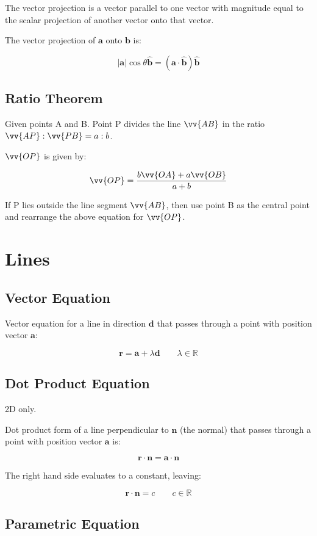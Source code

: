 \documentclass[a4paper,11pt]{report}
\newcommand{\bb}{\boldsymbol}
\begin{document}
The vector projection is a vector parallel to one vector with magnitude equal to
the scalar projection of another vector onto that vector.

The vector projection of $\bb{a}$ onto $\bb{b}$ is:

$$
\lvert \bb{a} \rvert \cos{\theta} \hat{\bb{b}} = (\bb{a} \cdot \hat{\bb{b}}) \hat{\bb{b}}
$$

\subsection{Ratio Theorem}

Given points A and B. Point P divides the line $\vv{AB}$ in the ratio
$\vv{AP} : \vv{PB} = a : b$.

$\vv{OP}$ is given by:

$$
\vv{OP} = \frac{b\vv{OA} + a\vv{OB}}{a + b}
$$

If P lies outside the line segment $\vv{AB}$, then use point B as the central
point and rearrange the above equation for $\vv{OP}$.


\section{Lines}

\subsection{Vector Equation}

Vector equation for a line in direction $\bb{d}$ that passes through a point
with position vector $\bb{a}$:

$$
\bb{r} = \bb{a} + \lambda \bb{d} \qquad \lambda \in \mathbb{R}
$$

\subsection{Dot Product Equation}

2D only.

Dot product form of a line perpendicular to $\bb{n}$ (the normal) that passes
through a point with position vector $\bb{a}$ is:

$$
\bb{r} \cdot \bb{n} = \bb{a} \cdot \bb{n}
$$

The right hand side evaluates to a constant, leaving:

$$
\bb{r} \cdot \bb{n} = c \qquad c \in \mathbb{R}
$$

\subsection{Parametric Equation}
\end{document}
